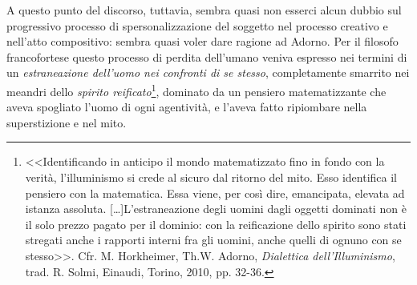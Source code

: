 \documentclass[a4paper,12pt]{scrartcl}
\newcommand{\omissis}{[\dots\unkern]}
\begin{document}
	A questo punto del discorso, tuttavia, sembra quasi non esserci alcun dubbio sul progressivo processo di spersonalizzazione del soggetto nel processo creativo e nell'atto compositivo: sembra quasi voler dare ragione ad Adorno. Per il filosofo francofortese questo processo di perdita dell'umano veniva espresso nei termini di un \emph{estraneazione dell'uomo nei confronti di se stesso}, completamente smarrito nei meandri dello \emph{spirito reificato}\footnote{<<Identificando in anticipo il mondo matematizzato fino in fondo con la verità, l'illuminismo si crede al sicuro dal ritorno del mito. Esso identifica il pensiero con la matematica. Essa viene, per così dire, emancipata, elevata ad istanza assoluta. \omissis L'estraneazione degli uomini dagli oggetti dominati non è il solo prezzo pagato per il dominio: con la reificazione dello spirito sono stati stregati anche i rapporti interni fra gli uomini, anche quelli di ognuno con se stesso>>. Cfr. M. Horkheimer, Th.W. Adorno, \textit{Dialettica dell'Illuminismo}, trad. R. Solmi, Einaudi, Torino, 2010, pp. 32-36.}, 
	dominato da un pensiero matematizzante che aveva spogliato l'uomo di ogni agentività, e l'aveva fatto ripiombare nella superstizione e nel mito.
	
\end{document}
